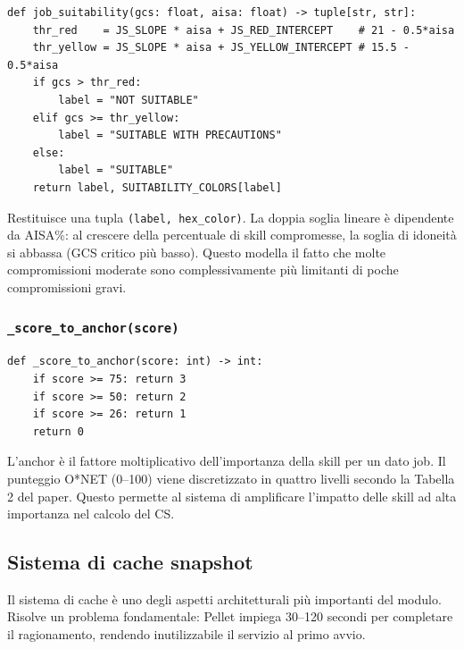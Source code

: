 \documentclass[a4paper,12pt]{article}
\begin{document}
\begin{lstlisting}[caption={Classificazione di idoneit\`{a} per coppia (GCS\%, AISA\%).}]
def job_suitability(gcs: float, aisa: float) -> tuple[str, str]:
    thr_red    = JS_SLOPE * aisa + JS_RED_INTERCEPT    # 21 - 0.5*aisa
    thr_yellow = JS_SLOPE * aisa + JS_YELLOW_INTERCEPT # 15.5 - 0.5*aisa
    if gcs > thr_red:
        label = "NOT SUITABLE"
    elif gcs >= thr_yellow:
        label = "SUITABLE WITH PRECAUTIONS"
    else:
        label = "SUITABLE"
    return label, SUITABILITY_COLORS[label]
\end{lstlisting}

\noindent Restituisce una tupla \texttt{(label, hex\_color)}. La doppia soglia
lineare \`{e} dipendente da AISA\%: al crescere della percentuale di
skill compromesse, la soglia di idoneit\`{a} si abbassa (GCS critico pi\`{u}
basso). Questo modella il fatto che molte compromissioni moderate sono
complessivamente pi\`{u} limitanti di poche compromissioni gravi.

\subsubsection{\texttt{\_score\_to\_anchor(score)}}

\begin{lstlisting}[caption={Conversione punteggio O*NET in anchor [0-3] (Tabella 2 del paper).}]
def _score_to_anchor(score: int) -> int:
    if score >= 75: return 3
    if score >= 50: return 2
    if score >= 26: return 1
    return 0
\end{lstlisting}

\noindent L'anchor \`{e} il fattore moltiplicativo dell'importanza della skill per
un dato job. Il punteggio O*NET (0--100) viene discretizzato in quattro
livelli secondo la Tabella 2 del paper. Questo permette al sistema di
amplificare l'impatto delle skill ad alta importanza nel calcolo del CS.

\subsection{Sistema di cache snapshot}

Il sistema di cache \`{e} uno degli aspetti architetturali pi\`{u}
importanti del modulo. Risolve un problema fondamentale: Pellet impiega
30--120 secondi per completare il ragionamento, rendendo inutilizzabile
il servizio al primo avvio.
\end{document}
